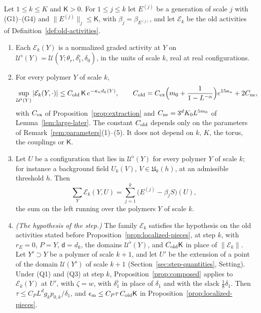 \begin{proposition}\label{prop:old-activities}
Let $1\le k\le K$ and $\mathsf K>0$. For $1\le j\le k$ let $E^{(j)}$ be a generation of scale $j$ with (G1)--(G4) and $\|E^{(j)}\|_j\le\mathsf K$, with $\beta_j=\beta_{E^{(j)}}$, and let $\mathcal E_k$ be the old activities of Definition~\ref{def:old-activities}.
\begin{enumerate}[label=(\alph*)]
\item Each $\mathcal E_k(Y)$ is a normalized graded activity at $Y$ on $\mathcal U^\flat(Y)=\mathcal U(Y;\theta_r,\delta_1^\flat,\delta_0)$, in the units of scale $k$, real at real configurations.
\item For every polymer $Y$ of scale $k$,
\[
\sup_{\mathcal U^\flat(Y)}|\mathcal E_k(Y,\cdot)|\le C_{\rm old}\,\mathsf K\,e^{-\kappa_nd_k(Y)},\qquad C_{\rm old}=C_{\rm ex}\Big(m_0+\frac1{1-L^{-\alpha}}\Big)e^{15\kappa_n}+2C_{\rm ne},
\]
with $C_{\rm ex}$ of Proposition~\ref{prop:extraction} and $C_{\rm ne}=3^dK_0L^{5m_0}$ of Lemma~\ref{lem:large-later}. The constant $C_{\rm old}$ depends only on the parameters of Remark~\ref{rem:parameters}(1)--(5). It does not depend on $k$, $K$, the torus, the couplings or $\mathsf K$.
\item Let $U$ be a configuration that lies in $\mathcal U^\flat(Y)$ for every polymer $Y$ of scale $k$; for instance a background field $U_k(V)$, $V\in\mathfrak U_k(h)$, at an admissible threshold $h$. Then
\[
\sum_Y\mathcal E_k(Y,U)=\sum_{j=1}^k\big(E^{(j)}-\beta_jS\big)(U),
\]
the sum on the left running over the polymers $Y$ of scale $k$.
\item \emph{(The hypothesis of the step.)} The family $\mathcal E_k$ satisfies the hypothesis on the old activities stated before Proposition~\ref{prop:localized-pieces}, at step $k$, with $r_E=0$, $P=Y$, $\mathsf d=d_k$, the domains $\mathcal U^\flat(Y)$, and $C_{\rm old}\mathsf K$ in place of $\|\mathcal E_k\|$. Let $Y'\supset Y$ be a polymer of scale $k+1$, and let $U'$ be the extension of a point of the domain $\mathcal U(Y')$ of scale $k+1$ (Section~\ref{sec:step-quantities}, Setting). Under (Q1) and (Q3) at step $k$, Proposition~\ref{prop:composed} applies to $\mathcal E_k(Y)$ at $U'$, with $\zeta=w$, with $\delta_1^\flat$ in place of $\delta_1$ and with the slack $\frac18\delta_1$. Then $\tau\le C_PL^dg_kp_{0,k}/\delta_1$, and $\epsilon_{\rm m}\le C_P\tau\,C_{\rm old}\mathsf K$ in Proposition~\ref{prop:localized-pieces}.
\end{enumerate}
\end{proposition}

